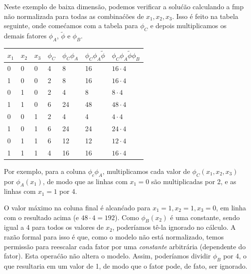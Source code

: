 \begin{exenumerate}
\begin{solution}
        Neste exemplo de baixa dimens\~ao, podemos verificar a solu\'c\~ao
        calculando a fmp n\~ao normalizada para todas as combina\'c\~oes de
        $x_1,x_2,x_3$. Isso \'e feito na tabela seguinte, onde come\'camos
        com a tabela para $\phi_C$ e depois multiplicamos os demais
        fatores $\phi_A$, $\tilde{\phi}$ e $\phi_B$. 
        \begin{center}
            \begin{tabular}{lllllll}
                \toprule
                $x_1$ & $x_2$ & $x_3$ & $\phi_C$ & $\phi_C \phi_A$ & $\phi_C \phi_A\tilde{\phi}$& $\phi_C \phi_A\tilde{\phi}\phi_B$ \\
                \midrule
                0 & 0 & 0 & 4 & 8 & 16 & $16\cdot 4$\\
                1 & 0 & 0 & 2 & 8 & 16 & $16 \cdot 4$\\
                0 & 1 & 0 & 2 & 4 & 8 & $8\cdot 4$\\
                1 & 1 & 0 & 6 & 24& 48 & $48 \cdot 4$\\
                0 & 0 & 1 & 2 & 4 & 4  & $4 \cdot 4$\\
                1 & 0 & 1 & 6 & 24 & 24 & $24 \cdot 4$\\
                0 & 1 & 1 & 6 & 12 & 12 & $12 \cdot 4$\\
                1 & 1 & 1 & 4 & 16 & 16 & $16\cdot 4$\\
                \bottomrule
            \end{tabular}
        \end{center}
        Por exemplo, para a coluna $\phi_c \phi_A$, multiplicamos cada
        valor de $\phi_C(x_1, x_2, x_3)$ por $\phi_A(x_1)$, de modo que as
        linhas com $x_1=0$ s\~ao multiplicadas por 2, e as linhas com $x_1=1$
        por 4.
        
        O valor m\'aximo na coluna final \'e alcan\'cado para $x_1=1,
        x_2=1, x_3=0$, em linha com o resultado acima (e $48\cdot 4 =
        192$). Como $\phi_B(x_2)$ \'e uma constante, sendo igual a 4 para todos
        os valores de $x_2$, poder\'iamos t\^e-la ignorado no c\'alculo. A
        raz\~ao formal para isso \'e que, como o modelo n\~ao est\'a normalizado,
        temos permiss\~ao para reescalar cada fator por uma \emph{constante}
        arbitr\'aria (dependente do fator). Esta opera\'c\~ao n\~ao altera o
        modelo. Assim, poder\'iamos dividir $\phi_B$ por 4, o que resultaria em
        um valor de 1, de modo que o fator pode, de fato, ser ignorado.
        

\end{solution}
\end{exenumerate}
